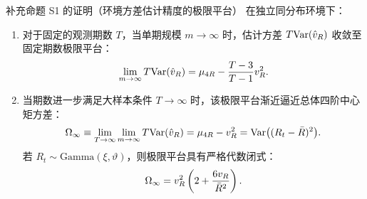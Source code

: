 \begin{theorembox}{补充命题 S1 的证明（环境方差估计精度的极限平台）}
在独立同分布环境下：
\begin{enumerate}[label=(\roman*)]
  \item 对于固定的观测期数 $T$，当单期规模 $m \to \infty$ 时，估计方差 $T \mathrm{Var}(\hat{v}_R)$ 收敛至固定期数极限平台：
  \begin{equation}
    \lim_{m \to \infty} T \mathrm{Var}(\hat{v}_R) = \mu_{4R} - \frac{T - 3}{T - 1} v_R^2.
    \label{eq:omega-T-fixed}
  \end{equation}
  \item 当期数进一步满足大样本条件 $T \to \infty$ 时，该极限平台渐近逼近总体四阶中心矩方差：
  \begin{equation}
    \Omega_\infty \equiv \lim_{T \to \infty} \lim_{m \to \infty} T \mathrm{Var}(\hat{v}_R) = \mu_{4R} - v_R^2 = \mathrm{Var}\big((R_t - \bar{R})^2\big).
    \label{eq:omega-inf-def}
  \end{equation}
  若 $R_t \sim \text{Gamma}(\xi, \vartheta)$，则极限平台具有严格代数闭式：
  \begin{equation}
    \Omega_\infty = v_R^2 \left( 2 + \frac{6 v_R}{\bar{R}^2} \right).
    \label{eq:omega-gamma-closed}
  \end{equation}
\end{enumerate}
\end{theorembox}

